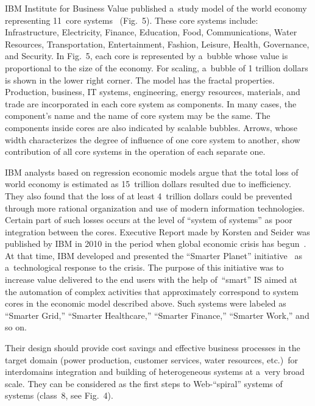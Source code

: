 \begin{multicols}{2}
 IBM Institute for Business Value published a~study model of the world economy representing 11~core
systems~\cite{5-sor} (Fig.~5). These core systems include: Infrastructure, Electricity, Finance, Education,
Food, \mbox{Communications}, Water Resources, Transportation, Entertainment, Fashion, Leisure, Health,
Governance, and Security. In Fig.~5, each core is represented by a~bubble whose value is proportional to
the size of the economy. For scaling, a~bubble of 1 trillion dollars is shown in the lower right corner. The
model has the fractal properties. Production, business, IT systems, engineering, energy resources, materials,
and trade are incorporated in each core system as components.
In many cases, the component's name and the name of
core system may be the same. The components inside cores are also indicated by scalable
bubbles. Arrows, whose width characterizes the degree of influence of one core system to another, show
contribution of all core systems in the operation of each separate one.

IBM analysts based on regression economic models argue that the total loss of world economy is estimated
as 15~trillion dollars resulted due to inefficiency. They also found that the loss of at least 4~trillion dollars
could be prevented through more rational organization and use of modern information technologies.
Certain part of such losses occurs at the level of ``system of systems'' as poor integration between the cores.
Executive Report made by Korsten and Seider was published by IBM in 2010 in the period
when global economic crisis has begun~\cite{5-sor}. At that time,
IBM developed and presented the ``Smarter Planet''
initiative~\cite{6-sor} as a~technological response to the crisis. The purpose of this initiative was to
increase value delivered to the end users with the help of~``smart'' IS aimed at the
automation of complex activities that approximately correspond to system cores in the economic model
described above. Such systems were labeled as ``Smarter Grid,'' ``Smarter Healthcare,'' ``Smarter Finance,''
``Smarter Work,'' and so on.




 Their design should provide cost savings and effective business processes
 in the target domain (power
production, customer services, water resources, etc.)\ for interdomains integration and building of
heterogeneous systems at a~very broad scale. They can be considered
as the first steps to Web-``spiral'' systems of systems (class~8, see Fig.~4).


\end{multicols}

